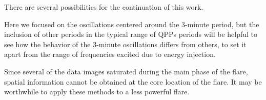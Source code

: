 





There are several possibilities for the continuation of this work.

Here we focused on the oscillations centered around the 3-minute period,
but the inclusion of other periods in the typical range of QPPs periods
will be helpful to see how the behavior of the 3-minute oscillations differs
from others, to set it apart from the range of frequencies excited due
to energy injection.

Since several of the data images saturated during the main phase of the flare,
spatial information cannot be obtained at the core location of the flare.
It may be worthwhile to apply these methods to a less powerful flare.

